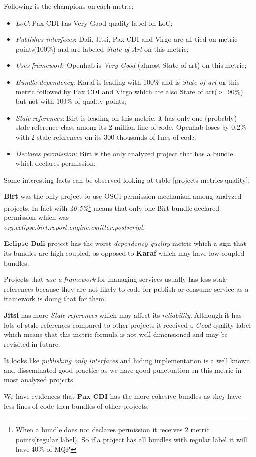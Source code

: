 Following is the champions on each metric:


\begin{itemize}
\item \emph{LoC}: Pax CDI has Very Good quality label on LoC;
\item \emph{Publishes interfaces}: Dali, Jitsi, Pax CDI and Virgo are all tied on metric points(100\%) and are labeled \emph{State of Art} on this metric;
\item \emph{Uses framework}: Openhab is \emph{Very Good} (almost State of art) on this metric;
\item \emph{Bundle dependency}: Karaf is leading with 100\% and is \emph{State of art} on this metric followed by Pax CDI and Virgo which are also State of art(>=90\%) but not with 100\% of quality points;  
\item \emph{Stale references}: Birt is leading on this metric, it has only one (probably) stale reference class among its 2 million line of code. Openhab loses by 0.2\% with 2 stale references on its 300 thousands of lines of code.  
\item \emph{Declares permission}: Birt is the only analyzed project that has a bundle which declares permission;
\end{itemize}

Some interesting facts can be observed looking at table \ref{projects-metrics-quality}:

\textbf{Birt} was the only project to use OSGi permission mechanism among analyzed projects. In fact with \emph{40.5\%}\footnote{When a bundle does not declares permission it receives 2 metric points(regular label). So if a project has all bundles with regular label it will have 40\% of MQP} means that only one Birt bundle declared permission which was \\\emph{org.eclipse.birt.report.engine.emitter.postscript}.

\textbf{Eclipse Dali} project has the worst \emph{dependency quality} metric which a sign that its bundles are high coupled, as opposed to \textbf{Karaf} which may have low coupled bundles.

Projects that \emph{use a framework} for managing services usually has less stale references because they are not likely to code for publish or consume service as a framework is doing that for them.

\textbf{Jitsi} has more \emph{Stale references} which may affect its \emph{reliability}. Although it has lots of stale references compared to other projects it received a \emph{Good} quality label which means that this metric formula is not well dimensioned and may be revisited in future.    

It looks like \emph{publishing only interfaces} and hiding implementation is a well known and disseminated good practice as we have good punctuation on this metric in most analyzed projects.  

We have evidences that \textbf{Pax CDI} has the more cohesive bundles as they have less lines of code then bundles of other projects.
 

